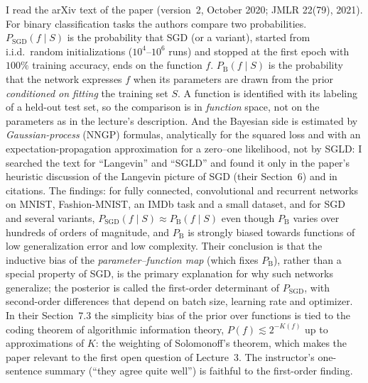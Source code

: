 \begin{beyond}
I read the arXiv text of the paper (version~2, October 2020; JMLR 22(79), 2021). For binary classification tasks the authors compare two probabilities. $P_{\mathrm{SGD}}(f\mid S)$ is the probability that SGD (or a variant), started from i.i.d.\ random initializations ($10^4$--$10^6$ runs) and stopped at the first epoch with $100\%$ training accuracy, ends on the function $f$. $P_{\mathrm B}(f\mid S)$ is the probability that the network expresses $f$ when its parameters are drawn from the prior \emph{conditioned on fitting} the training set $S$. A function is identified with its labeling of a held-out test set, so the comparison is in \emph{function} space, not on the parameters as in the lecture's description. And the Bayesian side is estimated by \emph{Gaussian-process} (NNGP) formulas, analytically for the squared loss and with an expectation-propagation approximation for a zero--one likelihood, not by SGLD: I searched the text for ``Langevin'' and ``SGLD'' and found it only in the paper's heuristic discussion of the Langevin picture of SGD (their Section~6) and in citations. The findings: for fully connected, convolutional and recurrent networks on MNIST, Fashion-MNIST, an IMDb task and a small dataset, and for SGD and several variants, $P_{\mathrm{SGD}}(f\mid S)\approx P_{\mathrm B}(f\mid S)$ even though $P_{\mathrm B}$ varies over hundreds of orders of magnitude, and $P_{\mathrm B}$ is strongly biased towards functions of low generalization error and low complexity. Their conclusion is that the inductive bias of the \emph{parameter--function map} (which fixes $P_{\mathrm B}$), rather than a special property of SGD, is the primary explanation for why such networks generalize; the posterior is called the first-order determinant of $P_{\mathrm{SGD}}$, with second-order differences that depend on batch size, learning rate and optimizer. In their Section~7.3 the simplicity bias of the prior over functions is tied to the coding theorem of algorithmic information theory, $P(f)\lesssim2^{-K(f)}$ up to approximations of $K$: the weighting of Solomonoff's theorem, which makes the paper relevant to the first open question of Lecture~3. The instructor's one-sentence summary (``they agree quite well'') is faithful to the first-order finding.
\end{beyond}


